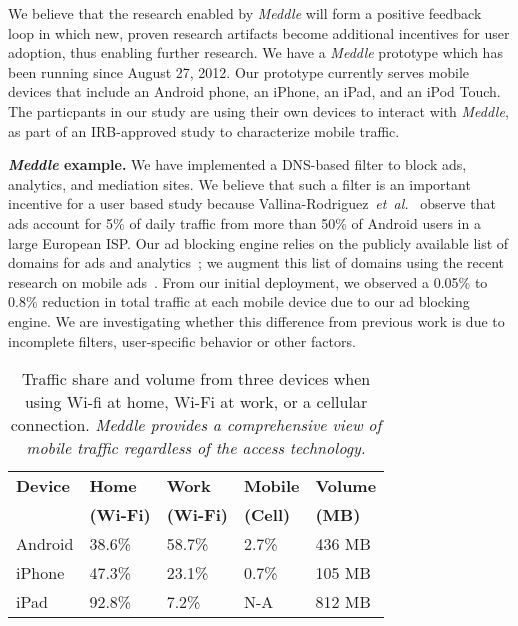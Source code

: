 \documentclass{sig-alternate}
\newcommand{\etal}{\emph{et~al.}}
\newcommand{\meddle}{{\em Meddle}\xspace}
\begin{document}
We believe that the research enabled by \meddle will form a positive
feedback loop in which new, proven research artifacts become
additional incentives for user adoption, thus enabling further
research. We have a \meddle prototype which has been running
since August 27, 2012. Our prototype currently serves mobile
devices that include an Android phone, an iPhone, an iPad, and an iPod 
Touch. The particpants in our study are using their own devices to 
interact with \meddle, as part of an
IRB-approved study to characterize mobile traffic.

\textbf{\meddle example.} We have implemented a DNS-based filter to
block ads, analytics, and mediation sites. We believe that such a filter is
an important incentive for a user based study because
Vallina-Rodriguez~\etal~\cite{Vallina-rodriguez:2012:AdCache} observe
that ads account for 5\% of daily traffic from more than 50\% of
Android users in a large European ISP. Our ad blocking engine relies
on the publicly available list of domains for ads and
analytics~\cite{YoyoAds}; we augment this list of domains using the
recent research on mobile ads~\cite{hornyack:appfence,
  Leontiadis:2012:AdsMobile}. From our initial deployment, we observed a 0.05\% to 0.8\% reduction
in total traffic at each mobile device due to our ad blocking engine. We 
are investigating whether this difference from previous work is due to incomplete filters, 
user-specific behavior or other factors.

\begin{table}
\centering
\begin{small}
\begin{tabular}{|l|l|l|l|l|}
\hline
{\bf Device} & {\bf Home} & {\bf Work} & {\bf Mobile} & {\bf Volume}\\
    & {\bf (Wi-Fi)} & {\bf (Wi-Fi)} & {\bf (Cell)} & {\bf (MB)}\\
\hline
Android & 38.6\% & 58.7\% & 2.7\%  & 436 MB\\
\hline
iPhone & 47.3\% & 23.1\% & 0.7\%  & 105 MB\\
\hline
iPad & 92.8\% & 7.2\% & N-A  & 812 MB\\
\hline

\end{tabular}
\end{small}
\caption{Traffic share and volume from three devices when using Wi-fi at
  home, Wi-Fi at work, or a cellular connection. \emph{\meddle provides a
    comprehensive view of mobile traffic regardless of the access
    technology.}} 
\label{tab:Usage}
\end{table}
\end{document}

